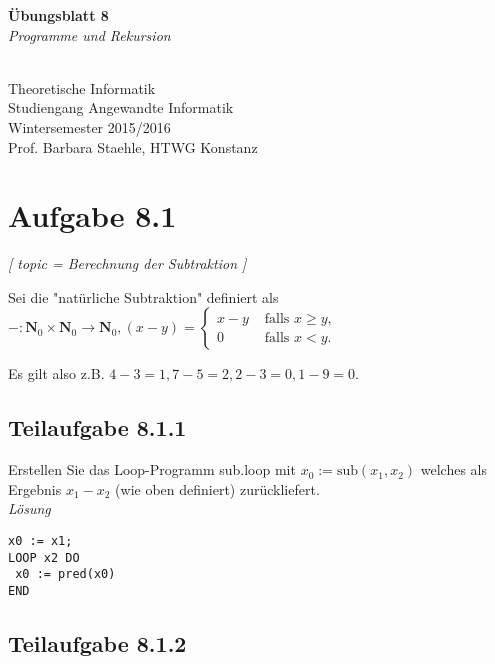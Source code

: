 \documentclass[12pt]{article}
\def \nat {\mathbf{N}}
\begin{document}
  
\begin{center}
\begin{huge}
\textbf{Übungsblatt 8}\\
\textit{Programme und Rekursion}
\end{huge} \\

Theoretische Informatik\\
Studiengang Angewandte Informatik\\
Wintersemester 2015/2016\\
Prof. Barbara Staehle, HTWG Konstanz
\end{center}

\section*{Aufgabe 8.1}

\textit{[ 
 topic = Berechnung der Subtraktion 
 ] }
  
 Sei die "natürliche Subtraktion" definiert als $-: \nat_0 \times \nat_0 \rightarrow \nat_0, (x-y) =  
 \left\{ 
 \begin{array}{ll} 
 x-y & \text{ falls } x \geq y, \\ 
 0 & \text{ falls } x < y. 
 \end{array} 
 \right . $   
  
 Es gilt also z.B. $4-3 = 1, 7-5 = 2, 2-3 = 0, 1-9 = 0$. 
  
 \subsection*{Teilaufgabe 8.1.1} 

 Erstellen Sie das Loop-Programm sub.loop mit $x_0:=\text{sub}(x_1,x_2)$ welches als Ergebnis $x_1 - x_2$ (wie oben definiert) zurückliefert. \\
  \emph{Lösung}\\
\begin{lstlisting}[frame=single] 
x0 := x1;
LOOP x2 DO 
 x0 := pred(x0)
END
\end{lstlisting}



  
  
 \subsection*{Teilaufgabe 8.1.2} 
\end{document}
